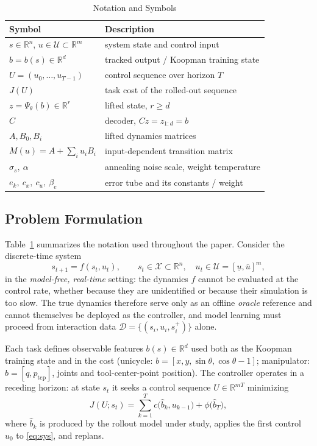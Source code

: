 \documentclass[lettersize,journal]{IEEEtran}
\theoremstyle{remark}
\begin{document}
\begin{table}[t]
\centering
\caption{Notation and Symbols}
\label{tab:notation}
\begin{tabularx}{\linewidth}{l X}
\hline
Symbol & Description \\
\hline
$s \in \mathbb{R}^n$, $u \in \mathcal{U} \subset \mathbb{R}^m$ & system state and control input \\
$b = b(s) \in \mathbb{R}^d$ & tracked output / Koopman training state \\
$U = (u_0, \dots, u_{T-1})$ & control sequence over horizon $T$ \\
$J(U)$ & task cost of the rolled-out sequence \\
$z = \Psi_\theta(b) \in \mathbb{R}^r$ & lifted state, $r \ge d$ \\
$C$ & decoder, $Cz = z_{1:d} = b$ \\
$A, B_0, B_i$ & lifted dynamics matrices \\
$M(u) = A + \sum_i u_i B_i$ & input-dependent transition matrix \\
$\sigma_s,\ \alpha$ & annealing noise scale, weight temperature \\
$e_k,\ c_x,\ c_u,\ \beta_e$ & error tube and its constants / weight \\
\hline
\end{tabularx}
\end{table}

\subsection{Problem Formulation}\label{subsec:problem}

Table~\ref{tab:notation} summarizes the notation used throughout the
paper. Consider the discrete-time system
\begin{equation}
s_{t+1} = f(s_t, u_t), \qquad
s_t \in \mathcal{X} \subset \mathbb{R}^{n},\quad
u_t \in \mathcal{U} = [\underline{u}, \bar{u}]^{m},
\label{eq:sys}
\end{equation}
in the \emph{model-free, real-time} setting: the dynamics $f$ cannot be
evaluated at the control rate, whether because they are unidentified or
because their simulation is too slow. The true dynamics therefore serve
only as an offline \emph{oracle} reference and cannot themselves be
deployed as the controller, and model learning must proceed from
interaction data $\mathcal{D} = \{(s_i, u_i, s_i^{+})\}$ alone.

Each task defines observable features $b(s) \in \mathbb{R}^{d}$ used both as
the Koopman training state and in the cost (unicycle:
$b = [x, y, \sin\theta, \cos\theta - 1]$; manipulator:
$b = [q, p_{\mathrm{tcp}}]$, joints and tool-center-point position). The controller operates in a receding
horizon: at state $s_t$ it seeks a control sequence
$U \in \mathbb{R}^{mT}$ minimizing
\begin{equation}
J(U; s_t) = \sum_{k=1}^{T} c\big(\hat{b}_k, u_{k-1}\big)
+ \phi\big(\hat{b}_T\big),
\label{eq:cost}
\end{equation}
where $\hat b_k$ is produced by the rollout model under study, applies the
first control $u_0$ to \eqref{eq:sys}, and replans.
\end{document}
